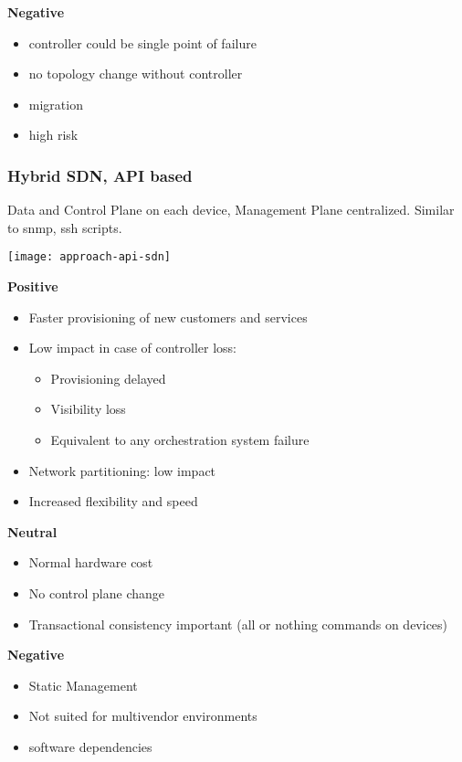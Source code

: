 \noindent
\textbf{Negative}
\begin{itemize}
	\item controller could be single point of failure 
	\item no topology change without controller 
	\item migration
	\item high risk
\end{itemize} 

\subsubsection{Hybrid SDN, API based}
Data and Control Plane on each device, Management Plane centralized. Similar to snmp, ssh scripts. 

\texttt{[image: approach-api-sdn]}

\noindent
\textbf{Positive}
\begin{itemize}
	\item Faster provisioning of new customers and services 
    \item Low impact in case of controller loss: 
	\begin{itemize}
        \item Provisioning delayed
        \item Visibility loss 
		\item Equivalent to any orchestration system failure 
	\end{itemize}
	\item Network partitioning: low impact 
	\item Increased flexibility and speed 
\end{itemize}

\noindent
\textbf{Neutral}
\begin{itemize}
\item Normal hardware cost 
\item No control plane change 
\item Transactional consistency important (all or nothing commands on devices)  
\end{itemize}

\noindent
\textbf{Negative}
\begin{itemize}
	\item Static Management
    \item Not suited for multivendor environments 
	\item software dependencies  
\end{itemize}

